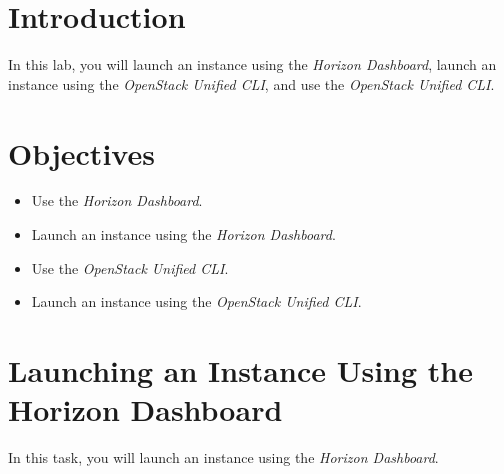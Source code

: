 \documentclass[letterpaper, 12pt]{article}
\begin{document}

\section*{Introduction}
\label{sec:introduction}
In this lab, you will launch an instance using the \textit{Horizon Dashboard}, launch an instance using the
\textit{OpenStack Unified CLI}, and use the \textit{OpenStack Unified CLI}.

\section*{Objectives}
\label{sec:objectives}
\begin{itemize}[itemsep=0pt]
    \item Use the \textit{Horizon Dashboard}.
    \item Launch an instance using the \textit{Horizon Dashboard}.
    \item Use the \textit{OpenStack Unified CLI}.
    \item Launch an instance using the \textit{OpenStack Unified CLI}.
\end{itemize}
\clearpage

\labsettings

\section{Launching an Instance Using the Horizon Dashboard}
In this task, you will launch an instance using the \textit{Horizon Dashboard}.
\end{document}
